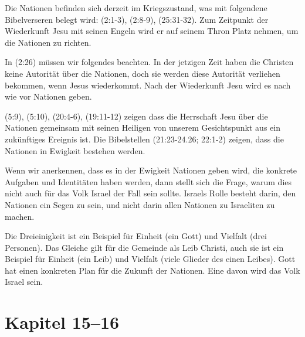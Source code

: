 \documentclass[fontsize=14pt]{../../inc/mybib}
\begin{document}
Die Nationen befinden sich derzeit im Kriegszustand, was mit folgendene Bibelverseren belegt wird: (2:1-3), (2:8-9), (25:31-32). Zum Zeitpunkt der Wiederkunft Jesu mit seinen Engeln wird er auf seinem Thron Platz nehmen, um die Nationen zu richten.

In (2:26) müssen wir folgendes beachten. In der jetzigen Zeit haben die Christen keine Autorität über die Nationen, doch sie werden diese Autorität verliehen bekommen, wenn Jesus wiederkommt. Nach der Wiederkunft Jesu wird es nach wie vor Nationen geben.

(5:9), (5:10), (20:4-6), (19:11-12) zeigen dass die Herrschaft Jesu über die Nationen gemeinsam mit seinen Heiligen von unserem Gesichtspunkt aus ein zukünftiges Ereignis ist.
Die Bibelstellen (21:23-24.26; 22:1-2) zeigen, dass die Nationen in Ewigkeit bestehen werden.

Wenn wir anerkennen, dass es in der Ewigkeit Nationen geben wird, die konkrete Aufgaben und Identitäten haben werden, dann stellt sich die Frage, warum dies nicht auch für das Volk Israel der Fall sein sollte. Israels Rolle besteht darin, den Nationen ein Segen zu sein, und nicht darin allen Nationen zu Israeliten zu machen.

Die Dreieinigkeit ist ein Beispiel für Einheit (ein Gott) und Vielfalt (drei Personen). Das Gleiche gilt für die Gemeinde als Leib Christi, auch sie ist ein Beispiel für Einheit (ein Leib) und Vielfalt (viele Glieder des einen Leibes). Gott hat einen konkreten Plan für die Zukunft der Nationen. Eine davon wird das Volk Israel sein.

\section{Kapitel 15--16}
\end{document}
